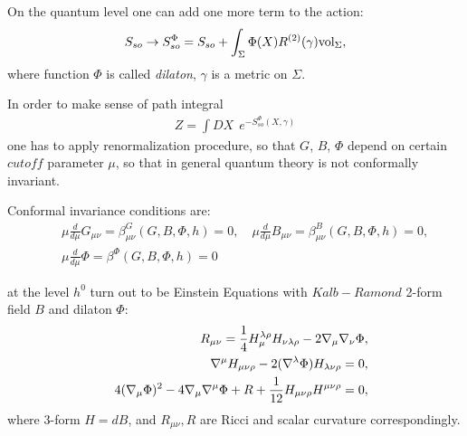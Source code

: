 \documentclass[9pt]{beamer}
\begin{document}
\begin{frame}

  
On the quantum level one can add one more term to the action: 
\begin{eqnarray*}
S_{so}\to S_{so}^{\Phi}=S_{so}+ \int_{\Sigma}\Phi(X)R^{(2)}(\gamma){\rm vol}_{\Sigma},
\end{eqnarray*}
where function $\Phi$ is called {\it dilaton}, $\gamma$ is a metric on $\Sigma$.\\

\vspace*{3mm}

In order to make sense of path integral
\begin{eqnarray*}
Z=\int DX ~\ e^{-S^{\Phi}_{so}(X, \gamma)}
\end{eqnarray*}
one has to apply renormalization procedure, so that $G$, $B$, $\Phi$ depend 
on certain $cutoff$ parameter $\mu$, so that in general quantum theory is not conformally invariant. 

\end{frame}
\begin{frame}

Conformal invariance conditions are:
\begin{eqnarray*}
&&\mu\frac{d}{d\mu}G_{\mu\nu}=\beta^G_{\mu\nu}(G,B,\Phi, h)=0, \quad  \mu\frac{d}{d\mu}B_{\mu\nu}=\beta^B_{\mu\nu}(G,B,\Phi, h)=0,\\ 
&&\mu\frac{d}{d\mu}\Phi=\beta^{\Phi}(G,B,\Phi, h)=0
\end{eqnarray*}

at the level $h^0$ turn out to be Einstein Equations with $Kalb-Ramond$ 2-form field $B$ and dilaton $\Phi$:
\begin{eqnarray*}
&&R_{\mu\nu}={1\over 4} H_{\mu}^{\lambda\rho}H_{\nu\lambda\rho}-2\nabla_{\mu}
\nabla_{\nu}\Phi,\\
&&\nabla^{\mu}H_{\mu\nu\rho}-2(\nabla^{\lambda}\Phi)H_{\lambda\nu\rho}=0,
\nonumber\\
&&4(\nabla_{\mu}\Phi)^2-4\nabla_{\mu}\nabla^{\mu}\Phi+
R+{1\over 12} H_{\mu\nu\rho}H^{\mu\nu\rho}=0,\nonumber
\end{eqnarray*}
where 3-form $H=dB$, and $R_{\mu\nu}, R$ are Ricci and scalar curvature correspondingly. 
\end{frame}
\end{document}
